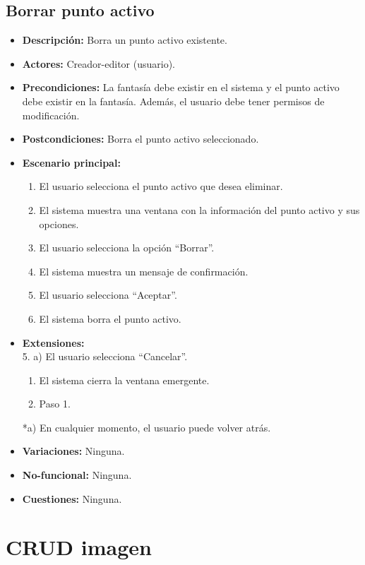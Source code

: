 \subsection{Borrar punto activo}
\begin{itemize}
	\item \textbf{Descripción:} Borra un punto activo existente.
	\item \textbf{Actores:} Creador-editor (usuario).
	\item \textbf{Precondiciones:} La fantasía debe existir en el sistema y el punto activo debe existir en la fantasía. Además, el usuario debe tener permisos de modificación.
	\item \textbf{Postcondiciones:} Borra el punto activo seleccionado.
	\item \textbf{Escenario principal:}
	\begin{enumerate}
		\item El usuario selecciona el punto activo que desea eliminar.
		\item El sistema muestra una ventana con la información del punto activo y sus opciones.
		\item El usuario selecciona la opción ``Borrar''.
		\item El sistema muestra un mensaje de confirmación.
		\item El usuario selecciona ``Aceptar''.
		\item El sistema borra el punto activo.
	\end{enumerate}
	\item \textbf{Extensiones:} \\ 5. a) El usuario selecciona ``Cancelar''.
	\begin{enumerate}
		\item El sistema cierra la ventana emergente.
		\item Paso 1.
	\end{enumerate}
	*a) En cualquier momento, el usuario puede volver atrás.
	\item \textbf{Variaciones:} Ninguna.
	\item \textbf{No-funcional:} Ninguna.
	\item \textbf{Cuestiones:} Ninguna.
\end{itemize}

\section{CRUD imagen} %
\hypertarget{crearimagen}{}
